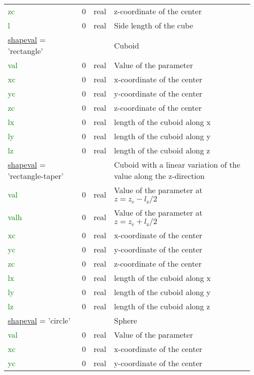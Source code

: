 \documentclass[12pt,twoside]{article}
\begin{document}
\begin{longtable}{|p{4.8cm}|p{2cm}|p{2cm}|p{5.4cm}|}
\textcolor{green}{zc} & 0 & real & z-coordinate of the center\\
\textcolor{green}{l} & 0 & real & Side length of the cube\\
\hdashline
\uline{shapeval} = 'rectangle' & & & Cuboid\vspace{0.25cm}\\
\textcolor{green}{val} & 0 & real & Value of the parameter\\
\textcolor{green}{xc} & 0 & real & x-coordinate of the center\\
\textcolor{green}{yc} & 0 & real & y-coordinate of the center\\
\textcolor{green}{zc} & 0 & real & z-coordinate of the center\\
\textcolor{green}{lx} & 0 & real & length of the cuboid along x\\
\textcolor{green}{ly} & 0 & real & length of the cuboid along y\\
\textcolor{green}{lz} & 0 & real & length of the cuboid along z\\
\hdashline
\uline{shapeval} = 'rectangle-taper' & & & Cuboid with a linear variation of the value along the z-direction\vspace{0.25cm}\\
\textcolor{green}{val} & 0 & real & Value of the parameter at $z=z_\text{c}-l_\text{z}/2$\\
\textcolor{green}{valh} & 0 & real & Value of the parameter at $z=z_\text{c}+l_\text{z}/2$\\
\textcolor{green}{xc} & 0 & real & x-coordinate of the center\\
\textcolor{green}{yc} & 0 & real & y-coordinate of the center\\
\textcolor{green}{zc} & 0 & real & z-coordinate of the center\\
\textcolor{green}{lx} & 0 & real & length of the cuboid along x\\
\textcolor{green}{ly} & 0 & real & length of the cuboid along y\\
\textcolor{green}{lz} & 0 & real & length of the cuboid along z\\
\hdashline
\uline{shapeval} = 'circle' & & & Sphere\vspace{0.25cm}\\
\textcolor{green}{val} & 0 & real & Value of the parameter\\
\textcolor{green}{xc} & 0 & real & x-coordinate of the center\\
\textcolor{green}{yc} & 0 & real & y-coordinate of the center\\

\end{longtable}
\end{document}
